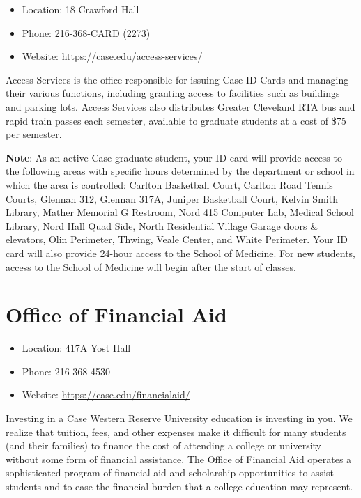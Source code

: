 \documentclass[
]{book}
\providecommand{\tightlist}{%
  \setlength{\itemsep}{0pt}\setlength{\parskip}{0pt}}
\begin{document}
\begin{itemize}
\tightlist
\item
  Location: 18 Crawford Hall
\item
  Phone: 216-368-CARD (2273)
\item
  Website: \url{https://case.edu/access-services/}
\end{itemize}

Access Services is the office responsible for issuing Case ID Cards and managing their various functions, including granting access to facilities such as buildings and parking lots. Access Services also distributes Greater Cleveland RTA bus and rapid train passes each semester, available to graduate students at a cost of \$75 per semester.

\textbf{Note}: As an active Case graduate student, your ID card will provide access to the following areas with specific hours determined by the department or school in which the area is controlled: Carlton Basketball Court, Carlton Road Tennis Courts, Glennan 312, Glennan 317A, Juniper Basketball Court, Kelvin Smith Library, Mather Memorial G Restroom, Nord 415 Computer Lab, Medical School Library, Nord Hall Quad Side, North Residential Village Garage doors \& elevators, Olin Perimeter, Thwing, Veale Center, and White Perimeter. Your ID card will also provide 24-hour access to the School of Medicine. For new students, access to the School of Medicine will begin after the start of classes.

\hypertarget{office-of-financial-aid}{%
\section{Office of Financial Aid}\label{office-of-financial-aid}}

\begin{itemize}
\tightlist
\item
  Location: 417A Yost Hall
\item
  Phone: 216-368-4530
\item
  Website: \url{https://case.edu/financialaid/}
\end{itemize}

Investing in a Case Western Reserve University education is investing in you. We realize that tuition, fees, and other expenses make it difficult for many students (and their families) to finance the cost of attending a college or university without some form of financial assistance. The Office of Financial Aid operates a sophisticated program of financial aid and scholarship opportunities to assist students and to ease the financial burden that a college education may represent.
\end{document}
